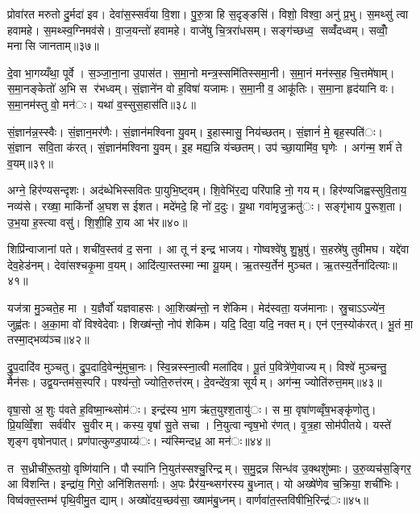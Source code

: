 प्रोवा॑रत मरुतो दु॒र्मदा॑ इव। देवा॑स॒स्सर्व॑या वि॒शा। पु॒रु॒त्रा हि स॒दृङ्ङसि॑। विशो॒ विश्वा॒ अनु॑ प्र॒भु। स॒मथ्सु॑ त्वा हवामहे। स॒मथ्स्व॒ग्निमव॑से। वा॒ज॒यन्तो॑ हवामहे। वाजे॑षु चि॒त्ररा॑धसम्। सङ्ग॑च्छध्व॒ सव्वँ॑दध्वम्। सव्वोँ॒ मनासि जानताम्॥३७॥

दे॒वा भा॒गय्यँथा॒ पूर्वे। स॒ञ्जा॒ना॒ना उ॒पास॑त। स॒मा॒नो मन्त्र॒स्समि॑तिस्समा॒नी। स॒मा॒नं मन॑स्स॒ह चि॒त्तमे॑षाम्। स॒मा॒नङ्केतो॑ अ॒भि स र॑भध्वम्। सं॒ज्ञाने॑न वो ह॒विषा॑ यजामः। स॒मा॒नी व॒ आकू॑तिः। स॒मा॒ना हृद॑यानि वः। स॒मा॒नम॑स्तु वो॒ मन॑ः। यथा॑ व॒स्सुस॒हास॑ति॥३८॥

सं॒ज्ञान॑न्न॒स्स्वैः। सं॒ज्ञान॒मर॑णैः। सं॒ज्ञान॑मश्विना यु॒वम्। इ॒हास्मासु॒ निय॑च्छतम्। सं॒ज्ञानं॑ मे॒ बृह॒स्पति॑ः। सं॒ज्ञान सवि॒ता क॑रत्। सं॒ज्ञान॑मश्विना यु॒वम्। इ॒ह मह्य॒न्नि य॑च्छतम्। उप॑ च्छा॒यामि॑व॒ घृणेः। अग॑न्म॒ शर्म॑ ते व॒यम्॥३९॥

अग्ने॒ हिर॑ण्यसन्दृशः। अद॑ब्धेभिस्सवितः पा॒युभि॒ष्ट्वम्। शि॒वेभि॑र॒द्य परि॑पाहि नो॒ गयम्। हिर॑ण्यजिह्वस्सुवि॒ताय॒ नव्य॑से। रख्षा॒ माकि॑र्नो अ॒घशस ईशत। मदे॑मदे॒ हि नो॑ द॒दुः। यू॒था गवा॑मृजु॒क्रतु॑ः। सङ्गृ॑भाय पु॒रूश॒ता। उ॒भ॒या ह॒स्त्या वसु॑। शि॒शी॒हि रा॒य आ भ॑र॥४०॥

शिप्रि॑न्वाजानां पते। शची॑व॒स्तव॑ द॒सना। आ तू न॑ इन्द्र भाजय। गोष्वश्वे॑षु शु॒भ्रुषु॑। स॒हस्रे॑षु तुवीमघ। यद्दे॑वा देव॒हेड॑नम्। देवा॑सश्चकृ॒मा व॒यम्। आदि॑त्या॒स्तस्मान्मा यू॒यम्। ऋ॒तस्य॒र्तेन॑ मुञ्चत। ऋ॒तस्य॒र्तेना॑दित्याः॥४१॥

यज॑त्रा मु॒ञ्चते॒ह मा। य॒ज्ञैर्वो॑ यज्ञवाहसः। आ॒शिख्ष॑न्तो॒ न शे॑किम। मेद॑स्वता॒ यज॑मानाः। स्रु॒चाऽऽज्ये॑न॒ जुह्व॑तः। अ॒का॒मा वो॑ विश्वेदेवाः। शिख्ष॑न्तो॒ नोप॑ शेकिम। यदि॒ दिवा॒ यदि॒ नक्तम्। एन॑ एन॒स्योक॑रत्। भू॒तं मा॒ तस्मा॒द्भव्य॑ञ्च॥४२॥

द्रु॒प॒दादि॑व मुञ्चतु। द्रु॒प॒दादि॒वेन्मु॑मुचा॒नः। स्वि॒न्नस्स्ना॒त्वी मला॑दिव। पू॒तं प॒वित्रे॑णे॒वाज्यम्। विश्वे॑ मुञ्चन्तु॒ मैन॑सः। उद्व॒यन्तम॑स॒स्परि॑। पश्य॑न्तो॒ ज्योति॒रुत्त॑रम्। दे॒वन्दे॑व॒त्रा सूर्यम्। अग॑न्म॒ ज्योति॑रुत्त॒मम्॥४३॥


वृषा॒सो अ॒शुः प॑वते ह॒विष्मा॒न्थ्सोम॑ः। इन्द्र॑स्य भा॒ग ऋ॑त॒युश्श॒तायु॑ः। स मा॒ वृषा॑णव्वृँष॒भङ्कृ॑णोतु। प्रि॒यव्विँ॒शा सर्व॑वीर सु॒वीरम्। कस्य॒ वृषा॑ सु॒ते सचा। नि॒युत्वान्वृष॒भो र॑णत्। वृ॒त्र॒हा सोम॑पीतये। यस्ते॑ शृङ्ग वृषोनपात्। प्रण॑पात्कुण्ड॒पाय्य॑ः। न्य॑स्मिन्दध्र॒ आ मन॑ः॥४४॥

त स॒ध्रीची॑रू॒तयो॒ वृष्णि॑यानि। पौस्या॑नि नि॒युत॑स्सश्चु॒रिन्द्रम्। स॒मु॒द्रन्न सिन्ध॑व उ॒क्थशु॑ष्माः। उ॒रु॒व्यच॑स॒ङ्गिर॒ आ वि॑शन्ति। इन्द्रा॑य॒ गिरो॒ अनि॑शितसर्गाः। अ॒पः प्रैर॑य॒न्थ्सग॑रस्य बु॒ध्नात्। यो अख्षे॑णेव च॒क्रिया॒ शची॑भिः। विष्व॑क्त॒स्तम्भ॑ पृथि॒वीमु॒त द्याम्। अख्षो॑दय॒च्छव॑सा॒ ख्षाम॑बु॒ध्नम्। वार्णवा॑त॒स्तवि॑षीभि॒रिन्द्र॑ः॥४५॥

